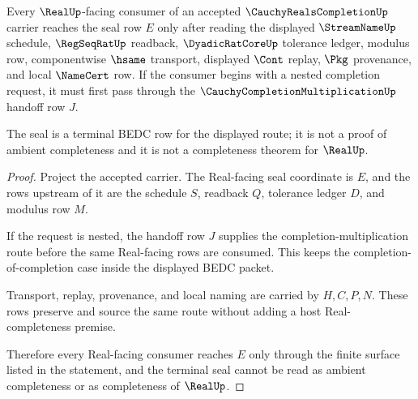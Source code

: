 \begin{theorem}
\label{thm:cauchy-reals-completion-real-seal}
Every $\RealUp$-facing consumer of an accepted $\CauchyRealsCompletionUp$ carrier reaches the seal row $E$ only after reading the displayed $\StreamNameUp$ schedule, $\RegSeqRatUp$ readback, $\DyadicRatCoreUp$ tolerance ledger, modulus row, componentwise $\hsame$ transport, displayed $\Cont$ replay, $\Pkg$ provenance, and local $\NameCert$ row. If the consumer begins with a nested completion request, it must first pass through the $\CauchyCompletionMultiplicationUp$ handoff row $J$.

The seal is a terminal BEDC row for the displayed route; it is not a proof of ambient completeness and it is not a completeness theorem for $\RealUp$.
\end{theorem}
\begin{proof}
Project the accepted carrier. The Real-facing seal coordinate is $E$, and the rows upstream of it are the schedule $S$, readback $Q$, tolerance ledger $D$, and modulus row $M$.

If the request is nested, the handoff row $J$ supplies the completion-multiplication route before the same Real-facing rows are consumed. This keeps the completion-of-completion case inside the displayed BEDC packet.

Transport, replay, provenance, and local naming are carried by $H,C,P,N$. These rows preserve and source the same route without adding a host Real-completeness premise.

Therefore every Real-facing consumer reaches $E$ only through the finite surface listed in the statement, and the terminal seal cannot be read as ambient completeness or as completeness of $\RealUp$.
\end{proof}


